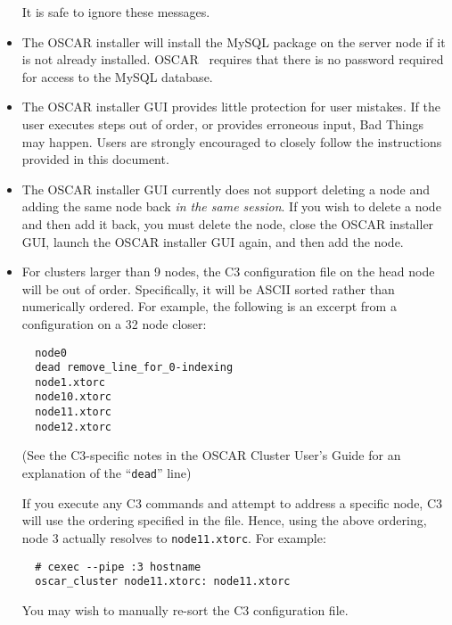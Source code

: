 \begin{itemize}
  It is safe to ignore these messages.
  
\item The OSCAR installer will install the MySQL package on the server
  node if it is not already installed.  OSCAR \oscarversion\ requires
  that there is no password required for  access to the
  MySQL database.
  
\item The OSCAR installer GUI provides little protection for user
  mistakes.  If the user executes steps out of order, or provides
  erroneous input, Bad Things may happen.  Users are strongly
  encouraged to closely follow the instructions provided in this
  document.

\item The OSCAR installer GUI currently does not support deleting a
  node and adding the same node back {\em in the same session}.  If
  you wish to delete a node and then add it back, you must delete the
  node, close the OSCAR installer GUI, launch the OSCAR installer GUI
  again, and then add the node.

\item For clusters larger than 9 nodes, the C3 configuration file on
  the head node will be out of order.  Specifically, it will be ASCII
  sorted rather than numerically ordered.  For example, the following
  is an excerpt from a configuration on a 32 node closer:

\begin{verbatim}
  node0
  dead remove_line_for_0-indexing
  node1.xtorc
  node10.xtorc
  node11.xtorc
  node12.xtorc
\end{verbatim}
  
  (See the C3-specific notes in the OSCAR Cluster User's Guide for an
  explanation of the ``{\tt dead}'' line)
  
  If you execute any C3 commands and attempt to address a specific
  node, C3 will use the ordering specified in the 
  file.  Hence, using the above ordering, node 3 actually resolves to
  {\tt node11.xtorc}.  For example:

\begin{verbatim}
  # cexec --pipe :3 hostname
  oscar_cluster node11.xtorc: node11.xtorc
\end{verbatim}
  
  You may wish to manually re-sort the C3 configuration file.
  
\end{itemize}

